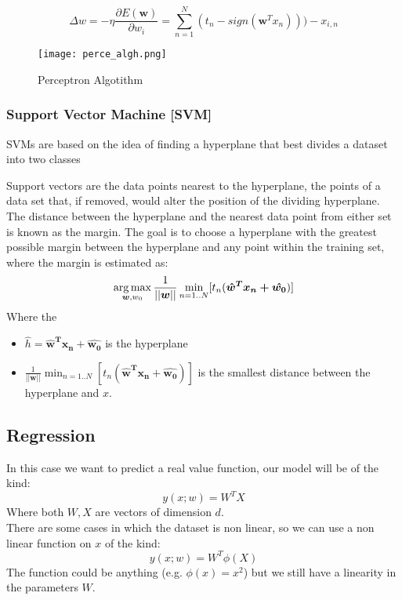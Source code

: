 \[\Delta w=-\eta \frac{\partial E(\bm{w}) }{\partial w_i}=\sum_{n=1}^N(t_n-sign(\bm{w}^Tx_n)))-x_{i,n} \]

\begin{figure}[H]
\texttt{[image: perce\_algh.png]}
\caption{Perceptron Algotithm}
\end{figure}

\subsubsection{Support Vector Machine [SVM]}
SVMs are based on the idea of finding a hyperplane that best divides a dataset into two classes


\begin{figure}[H]
    \centering
    \qquad

\label{fig:linear_problem}%
\end{figure}

Support vectors are the data points nearest to the hyperplane, the points of a data set that, if removed, would alter the position of the dividing hyperplane.\\
The distance between the hyperplane and the nearest data point from either set is known as the margin. The goal is to choose a hyperplane with the greatest possible margin between the hyperplane and any point within the training set, where the margin is estimated as:
\[\operatorname*{arg\,max}_{\bm{w},w_0}\frac{1}{||\bm{w}||}\min_{n=1..N}[t_n(\bm{\hat{w}^Tx_n+\hat{w_0}})]\]
Where the
\begin{itemize}
\item $\hat{h}=\bm{\hat{w}^Tx_n+\hat{w_0}}$ is the hyperplane
\item $\frac{1}{||\bm{w}||}\min_{n=1..N}[t_n(\bm{\hat{w}^Tx_n+\hat{w_0}})]$ is the smallest distance between the hyperplane and $x$.

\end{itemize}

\subsection{Regression}
In this case we want to predict a real value function, our model will be of the kind:
$$y(x;w)=W^TX$$
Where both $W,X$ are vectors of dimension $d$.\\
There are some cases in which the dataset is non linear, so we can use a non linear function on $x$ of the kind:
$$y(x;w)=W^T\phi (X)$$
The function could be anything (e.g. $\phi(x)=x^2$) but we still have a linearity in the parameters $W$.

